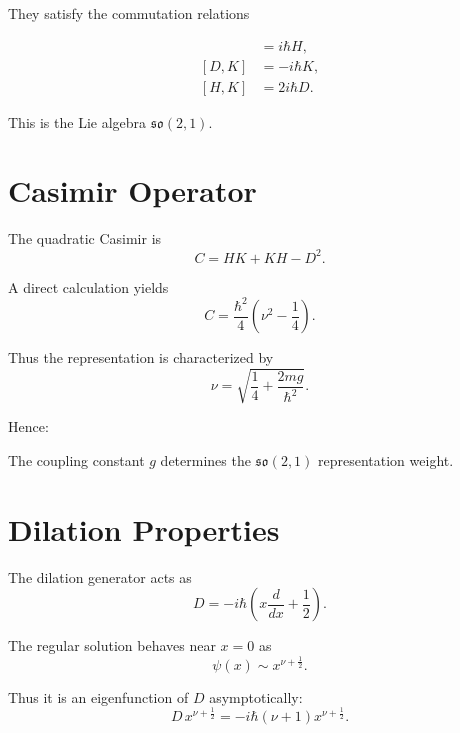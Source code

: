 \documentclass[11pt,a4paper]{article}
\begin{document}
They satisfy the commutation relations

\begin{align}
[ D,H ] &= i\hbar H, \\
[ D,K ] &= -i\hbar K, \\
[ H,K ] &= 2i\hbar D.
\end{align}

This is the Lie algebra $\mathfrak{so}(2,1)$.

\section{Casimir Operator}

The quadratic Casimir is
\begin{equation}
C = HK + KH - D^2.
\end{equation}

A direct calculation yields
\begin{equation}
C
=
\frac{\hbar^2}{4}
\left(
\nu^2-\frac{1}{4}
\right).
\end{equation}

Thus the representation is characterized by
\begin{equation}
\nu=\sqrt{\frac{1}{4}+\frac{2mg}{\hbar^2}}.
\end{equation}

Hence:

\begin{center}
The coupling constant $g$ determines the
$\mathfrak{so}(2,1)$ representation weight.
\end{center}

\section{Dilation Properties}

The dilation generator acts as
\begin{equation}
D=-i\hbar\left(x\frac{d}{dx}+\frac{1}{2}\right).
\end{equation}

The regular solution behaves near $x=0$ as
\begin{equation}
\psi(x)\sim x^{\nu+\frac{1}{2}}.
\end{equation}

Thus it is an eigenfunction of $D$ asymptotically:
\begin{equation}
D\,x^{\nu+\frac{1}{2}}
=
-i\hbar\left(\nu+1\right)x^{\nu+\frac{1}{2}}.
\end{equation}
\end{document}
